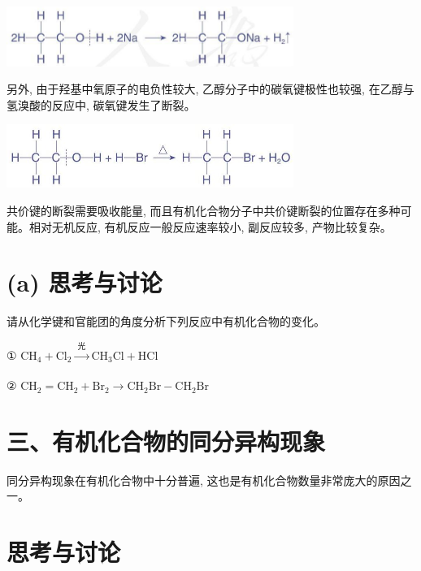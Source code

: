 \documentclass[10pt]{article}
\begin{document}
\begin{center}
\includegraphics[max width=0.7\textwidth]{images/0190efc5-b58a-7c43-bfb0-e0a030df9cfd_12_196206.jpg}
\end{center}

另外, 由于羟基中氧原子的电负性较大, 乙醇分子中的碳氧键极性也较强, 在乙醇与氢溴酸的反应中, 碳氧键发生了断裂。

\begin{center}
\includegraphics[max width=0.7\textwidth]{images/0190efc5-b58a-7c43-bfb0-e0a030df9cfd_12_382206.jpg}
\end{center}

共价键的断裂需要吸收能量, 而且有机化合物分子中共价键断裂的位置存在多种可能。相对无机反应, 有机反应一般反应速率较小, 副反应较多, 产物比较复杂。

\section*{(a) 思考与讨论}

请从化学键和官能团的角度分析下列反应中有机化合物的变化。

① \({\mathrm{{CH}}}_{4} + {\mathrm{{Cl}}}_{2}\xrightarrow[]{\text{ 光 }}{\mathrm{{CH}}}_{3}\mathrm{{Cl}} + \mathrm{{HCl}}\)

② \({\mathrm{{CH}}}_{2} = {\mathrm{{CH}}}_{2} + {\mathrm{{Br}}}_{2} \rightarrow {\mathrm{{CH}}}_{2}\mathrm{{Br}} - {\mathrm{{CH}}}_{2}\mathrm{{Br}}\)

\section*{三、有机化合物的同分异构现象}

同分异构现象在有机化合物中十分普遍, 这也是有机化合物数量非常庞大的原因之一。

\section*{思考与讨论}
\end{document}
